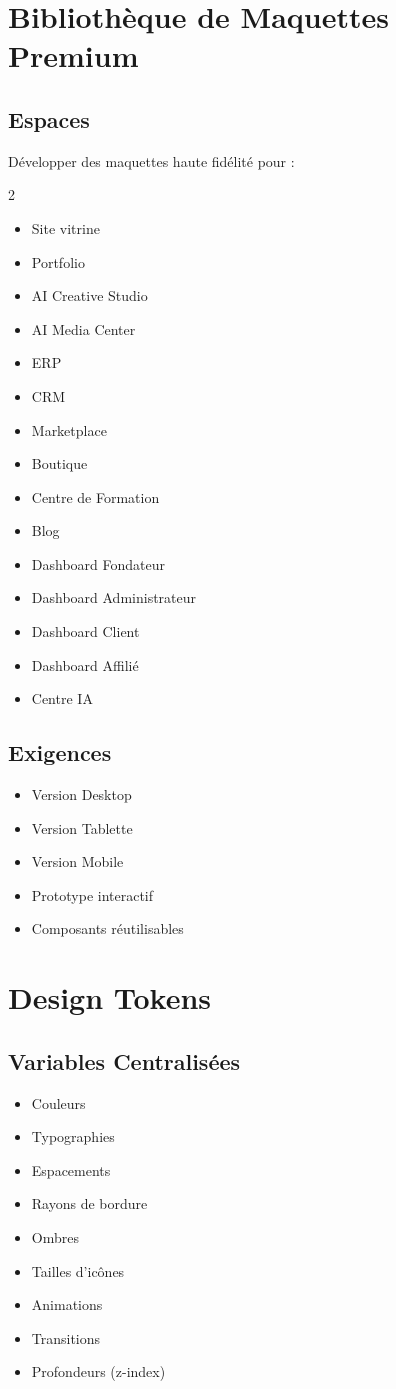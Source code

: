\documentclass[12pt,a4paper,oneside]{book}
\begin{document}
\chapter{Bibliothèque de Maquettes Premium}

\section{Espaces}
Développer des maquettes haute fidélité pour :
\begin{multicols}{2}
\begin{itemize}
\item Site vitrine
\item Portfolio
\item AI Creative Studio
\item AI Media Center
\item ERP
\item CRM
\item Marketplace
\item Boutique
\item Centre de Formation
\item Blog
\item Dashboard Fondateur
\item Dashboard Administrateur
\item Dashboard Client
\item Dashboard Affilié
\item Centre IA
\end{itemize}
\end{multicols}

\section{Exigences}
\begin{itemize}
\item Version Desktop
\item Version Tablette
\item Version Mobile
\item Prototype interactif
\item Composants réutilisables
\end{itemize}

\chapter{Design Tokens}

\section{Variables Centralisées}
\begin{itemize}
\item Couleurs
\item Typographies
\item Espacements
\item Rayons de bordure
\item Ombres
\item Tailles d'icônes
\item Animations
\item Transitions
\item Profondeurs (z-index)
\end{itemize}
\end{document}
